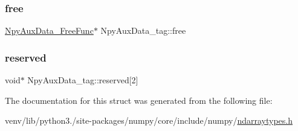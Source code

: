 \subsubsection{\texorpdfstring{free}{free}}
{\footnotesize\ttfamily \hyperlink{ndarraytypes_8h_a970fa0aaefc33b0807c11adedcdae522}{Npy\+Aux\+Data\+\_\+\+Free\+Func}$\ast$ Npy\+Aux\+Data\+\_\+tag\+::free}

\mbox{\label{structNpyAuxData__tag_a4abc038126e9770368d8ac88df8571d0}} 
\subsubsection{\texorpdfstring{reserved}{reserved}}
{\footnotesize\ttfamily void$\ast$ Npy\+Aux\+Data\+\_\+tag\+::reserved\mbox{[}2\mbox{]}}



The documentation for this struct was generated from the following file\+:\begin{DoxyCompactItemize}
\item 
venv/lib/python3./site-\/packages/numpy/core/include/numpy/\hyperlink{ndarraytypes_8h}{ndarraytypes.\+h}\end{DoxyCompactItemize}
